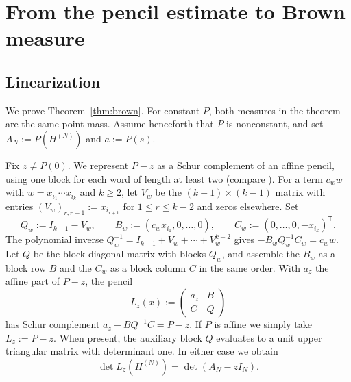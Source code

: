 \section{From the pencil estimate to Brown measure}\label{sec:brown}

\subsection{Linearization}\label{subsec:linearization}

We prove Theorem~\ref{thm:brown}.
For constant $P$, both measures in the theorem are the same point mass.
Assume henceforth that $P$ is nonconstant, and set $A_N:=P(H^{(N)})$ and $a:=P(s)$.

Fix $z\ne P(0)$.
We represent $P-z$ as a Schur complement of an affine pencil, using one block for each word of length at least two (compare \cite[Section~2.2]{Han26}).
For a term $c_w w$ with $w=x_{i_1}\cdots x_{i_k}$ and $k\ge 2$, let $V_w$ be the $(k-1)\times(k-1)$ matrix with entries $(V_w)_{r,r+1}:=x_{i_{r+1}}$ for $1\le r\le k-2$ and zeros elsewhere.
Set
\[
 Q_w:=I_{k-1}-V_w,\qquad
 B_w:=(c_w x_{i_1},0,\ldots,0),\qquad
 C_w:=(0,\ldots,0,-x_{i_k})^{\mathsf T}.
\]
The polynomial inverse $Q_w^{-1}=I_{k-1}+V_w+\cdots+V_w^{k-2}$ gives $-B_wQ_w^{-1}C_w=c_ww$.
Let $Q$ be the block diagonal matrix with blocks $Q_w$, and assemble the $B_w$ as a block row $B$ and the $C_w$ as a block column $C$ in the same order.
With $a_z$ the affine part of $P-z$, the pencil
\[
 L_z(x):=\begin{pmatrix}a_z&B\\ C&Q\end{pmatrix}
\]
has Schur complement $a_z-BQ^{-1}C=P-z$.
If $P$ is affine we simply take $L_z:=P-z$.
When present, the auxiliary block $Q$ evaluates to a unit upper triangular matrix with determinant one.
In either case we obtain
\begin{equation}\label{eq:linearization-det}
 \det L_z(H^{(N)})=\det(A_N-zI_N).
\end{equation}

